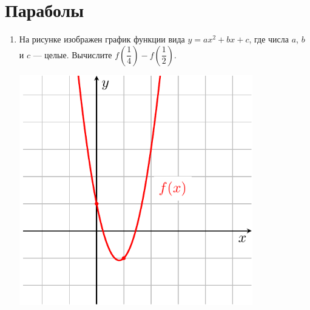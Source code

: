 \documentclass[12pt, a4paper]{article}
\begin{document}
		

\section{Параболы}
\begin{enumerate}
	\item
	\begin{minipage}[t][8cm][t]{0.5\textwidth}
		На рисунке изображен график функции вида $y=ax^2+bx+c$, где числа $a$, $b$ и $c$ — целые. Вычислите $f\left(\dfrac{1}{4}\right)-f\left(\dfrac{1}{2}\right)$.
		\begin{flushright}
		\end{flushright}
	\end{minipage}
	\begin{minipage}[t][8cm][t]{0.5\textwidth}
		\hspace{10pt}
		\includegraphics[align=t, width=0.8\textwidth]{graphs/graph_1/graph_1}
	\end{minipage}
\end{enumerate}
\end{document}
